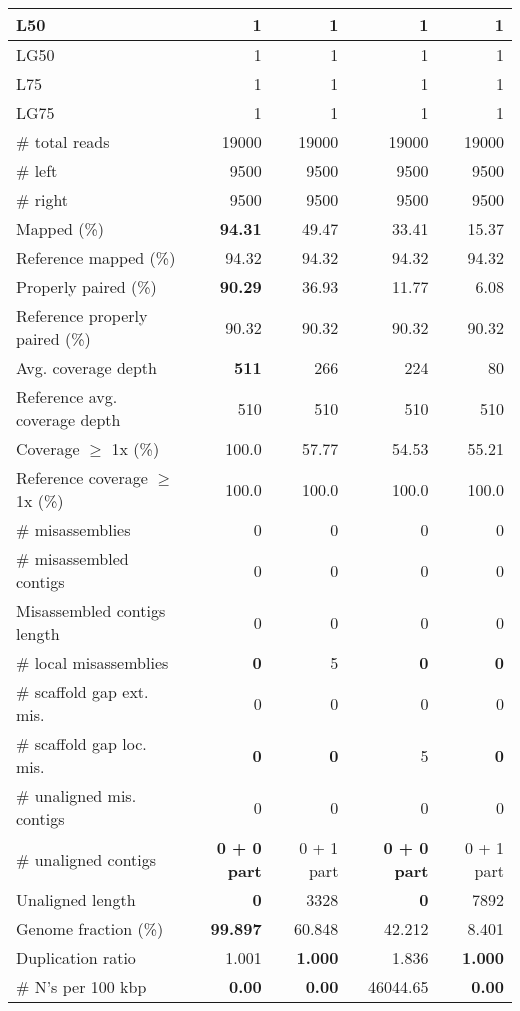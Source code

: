 \documentclass[12pt,a4paper]{article}
\begin{document}
\begin{table}[ht]
\begin{center}
\begin{tabular}{|l*{4}{|r}|}
L50 & 1 & 1 & 1 & 1 \\ \hline
LG50 & 1 & 1 & 1 & 1 \\ \hline
L75 & 1 & 1 & 1 & 1 \\ \hline
LG75 & 1 & 1 & 1 & 1 \\ \hline
\# total reads & 19000 & 19000 & 19000 & 19000 \\ \hline
\# left & 9500 & 9500 & 9500 & 9500 \\ \hline
\# right & 9500 & 9500 & 9500 & 9500 \\ \hline
Mapped (\%) & {\bf 94.31} & 49.47 & 33.41 & 15.37 \\ \hline
Reference mapped (\%) & 94.32 & 94.32 & 94.32 & 94.32 \\ \hline
Properly paired (\%) & {\bf 90.29} & 36.93 & 11.77 & 6.08 \\ \hline
Reference properly paired (\%) & 90.32 & 90.32 & 90.32 & 90.32 \\ \hline
Avg. coverage depth & {\bf 511} & 266 & 224 & 80 \\ \hline
Reference avg. coverage depth & 510 & 510 & 510 & 510 \\ \hline
Coverage $\geq$ 1x (\%) & 100.0 & 57.77 & 54.53 & 55.21 \\ \hline
Reference coverage $\geq$ 1x (\%) & 100.0 & 100.0 & 100.0 & 100.0 \\ \hline
\# misassemblies & 0 & 0 & 0 & 0 \\ \hline
\# misassembled contigs & 0 & 0 & 0 & 0 \\ \hline
Misassembled contigs length & 0 & 0 & 0 & 0 \\ \hline
\# local misassemblies & {\bf 0} & 5 & {\bf 0} & {\bf 0} \\ \hline
\# scaffold gap ext. mis. & 0 & 0 & 0 & 0 \\ \hline
\# scaffold gap loc. mis. & {\bf 0} & {\bf 0} & 5 & {\bf 0} \\ \hline
\# unaligned mis. contigs & 0 & 0 & 0 & 0 \\ \hline
\# unaligned contigs & {\bf 0 + 0 part} & 0 + 1 part & {\bf 0 + 0 part} & 0 + 1 part \\ \hline
Unaligned length & {\bf 0} & 3328 & {\bf 0} & 7892 \\ \hline
Genome fraction (\%) & {\bf 99.897} & 60.848 & 42.212 & 8.401 \\ \hline
Duplication ratio & 1.001 & {\bf 1.000} & 1.836 & {\bf 1.000} \\ \hline
\# N's per 100 kbp & {\bf 0.00} & {\bf 0.00} & 46044.65 & {\bf 0.00} \\ \hline

\end{tabular}
\end{center}
\end{table}
\end{document}
